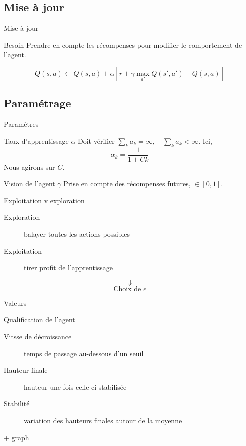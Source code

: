 \documentclass[tikz, footheight=2em]{beamer}
\begin{document}
\subsection{Mise à jour}
\begin{frame}[c]{Mise à jour}
  \begin{block}{Besoin}
    Prendre en compte les récompenses pour modifier le comportement de l'agent.
  \end{block}
  \pause{}
  \[
    Q(s, a) \leftarrow Q(s,a) + \alpha
    [r + \gamma \max_{a'} Q(s',a') - Q(s,a)]
  \]
\end{frame}

\subsection{Paramétrage}
\begin{frame}[c]{Paramètres}
  \begin{block}{Taux d'apprentissage \(\alpha\)}
    Doit vérifier \(\sum_{k} a_k = \infty, \quad \sum_k a_k < \infty \).
    \pause{}
    Ici, \[ \alpha_k = \frac{1}{1 + Ck} \]
    Nous agirons sur \(C\).
  \end{block}
  \pause{}
  \begin{block}{Vision de l'agent \(\gamma\)}
    Prise en compte des récompenses futures, \(\in [0,1]\).
  \end{block}
\end{frame}

\begin{frame}[c]{Exploitation v exploration}
  \begin{description}
    \item[Exploration] balayer toutes les actions possibles
    \item[Exploitation] tirer profit de l'apprentissage
  \end{description}
  \pause{}
  \[ \Downarrow \]
  \[ \text{Choix de } \epsilon \]
  \begin{block}{Valeurs}
  \end{block}
\end{frame}

\begin{frame}[c]{Qualification de l'agent}
  \begin{description}
    \item[Vitsse de décroissance] temps de passage au-dessous d'un seuil
    \item[Hauteur finale] hauteur une fois celle ci stabilisée
    \item[Stabilité] variation des hauteurs finales autour de la moyenne 
  \end{description}
  \pause{}
  + graph
\end{frame}
\end{document}
